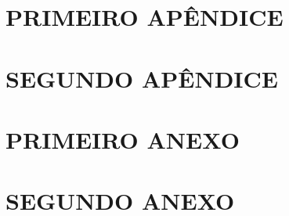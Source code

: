 \documentclass[
    12pt,				       %
    openright,			       %
    oneside,			       %
    a4paper,			       %
    chapter=TITLE,             %
    sumario=tradicional,       %
    english,			        %
    brazil, 				    %
 ]{abntex2}
\begin{document}


\begin{apendicesenv} \thispagestyle{empty}
    \partapendices %

    \chapter{\MakeUppercase{Primeiro Apêndice}} \thispagestyle{empty}

    \chapter{\MakeUppercase{Segundo Apêndice}} \thispagestyle{empty}
\end{apendicesenv}

\begin{anexosenv}
    \partanexos %

    \chapter{\MakeUppercase{Primeiro Anexo}} \thispagestyle{empty}

    \chapter{\MakeUppercase{Segundo Anexo}} \thispagestyle{empty}
\end{anexosenv}
\end{document}
